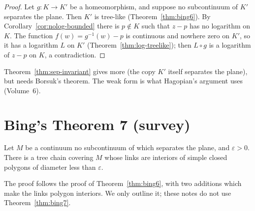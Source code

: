 \begin{proof}
Let $g\colon K\to K'$ be a homeomorphism, and suppose no subcontinuum of $K'$ separates the plane.
Then $K'$ is tree-like (Theorem~\ref{thm:bing6}). By Corollary~\ref{cor:nolog-bounded} there is $p\notin K$
such that $z-p$ has no logarithm on $K$. The function $f(w)=g^{-1}(w)-p$ is continuous and nowhere zero
on $K'$, so it has a logarithm $L$ on $K'$ (Theorem~\ref{thm:log-treelike}); then $L\circ g$ is a
logarithm of $z-p$ on $K$, a contradiction.
\end{proof}


Theorem~\ref{thm:sep-invariant} gives more (the copy $K'$ itself separates the plane), but needs
Borsuk's theorem. The weak form is what Hagopian's argument uses (Volume~6).

\section{Bing's Theorem 7 (survey)}

\begin{theorem}[Bing]\label{thm:bing7}
Let $M$ be a continuum no subcontinuum of which separates the plane, and $\varepsilon>0$. There is a
tree chain covering $M$ whose links are interiors of simple closed polygons of diameter less than
$\varepsilon$.
\end{theorem}


The proof follows the proof of Theorem~\ref{thm:bing6}, with two additions which make the links
polygon interiors. We only outline it; these notes do not use Theorem~\ref{thm:bing7}.

